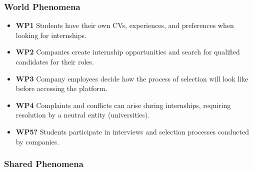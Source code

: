 \subsubsection{World Phenomena}

\begin{itemize}
    \item \textbf{WP1} Students have their own CVs, experiences, and preferences when looking for internships.
    \item \textbf{WP2} Companies create internship opportunities and search for qualified candidates for their roles.
    \item \textbf{WP3} Company employees decide how the process of selection will look like before accessing the platform.
    \item \textbf{WP4} Complaints and conflicts can arise during internships, requiring resolution by a neutral entity (universities).
    \item \textbf{WP5?} Students participate in interviews and selection processes conducted by companies.
    
\end{itemize}

\subsubsection{Shared Phenomena}

